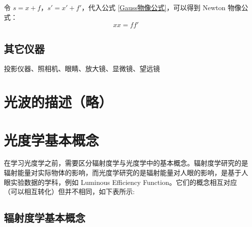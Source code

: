 \documentclass[UTF8]{report}
\theoremstyle{MyLineTheoremStyle} %
\theoremstyle{MyBlockTheoremStyle} %
\theoremstyle{MySubsubsectionStyle} %
\begin{document}
令 $s = x + f$，$s' = x' + f'$，代入公式 \ref{Gauss物像公式}，可以得到 Newton 物像公式：
\begin{equation}
xx = ff'
\end{equation}


\subsection{其它仪器}
投影仪器、照相机、眼睛、放大镜、显微镜、望远镜

\section{光波的描述（略）}
\section{光度学基本概念}

在学习光度学之前，需要区分辐射度学与光度学中的基本概念。辐射度学研究的是辐射能量对实际物体的影响，而光度学研究的是辐射能量对人眼的影响，是基于人眼实验数据的学科，例如 Luminous Efficiency Function。它们的概念相互对应（可以相互转化）但并不相同，如下表所示: 
\begin{table}[H]\centering
    \caption{\textbf{光度学与辐射度学概念对应关系}}
    \label{光度学与辐射度学概念对应关系}
\end{table}



\subsection{辐射度学基本概念}
\end{document}
